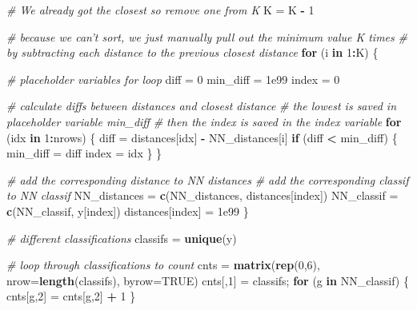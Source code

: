\documentclass[]{article}
\newenvironment{Shaded}{\begin{snugshade}}{\end{snugshade}}
\newcommand{\CommentTok}[1]{\textcolor[rgb]{0.56,0.35,0.01}{\textit{#1}}}
\newcommand{\ControlFlowTok}[1]{\textcolor[rgb]{0.13,0.29,0.53}{\textbf{#1}}}
\newcommand{\DataTypeTok}[1]{\textcolor[rgb]{0.13,0.29,0.53}{#1}}
\newcommand{\DecValTok}[1]{\textcolor[rgb]{0.00,0.00,0.81}{#1}}
\newcommand{\FloatTok}[1]{\textcolor[rgb]{0.00,0.00,0.81}{#1}}
\newcommand{\KeywordTok}[1]{\textcolor[rgb]{0.13,0.29,0.53}{\textbf{#1}}}
\newcommand{\NormalTok}[1]{#1}
\newcommand{\OperatorTok}[1]{\textcolor[rgb]{0.81,0.36,0.00}{\textbf{#1}}}
\newcommand{\OtherTok}[1]{\textcolor[rgb]{0.56,0.35,0.01}{#1}}
\newcommand{\StringTok}[1]{\textcolor[rgb]{0.31,0.60,0.02}{#1}}
\begin{document}
\begin{Shaded}
\begin{Highlighting}[]
  \CommentTok{# We already got the closest so remove one from K}
\NormalTok{  K =}\StringTok{ }\NormalTok{K }\OperatorTok{-}\StringTok{ }\DecValTok{1}
  
  \CommentTok{# because we can't sort, we just manually pull out the minimum value K times}
  \CommentTok{# by subtracting each distance to the previous closest distance}
  \ControlFlowTok{for}\NormalTok{ (i }\ControlFlowTok{in} \DecValTok{1}\OperatorTok{:}\NormalTok{K) \{}

    \CommentTok{# placeholder variables for loop}
\NormalTok{    diff =}\StringTok{ }\DecValTok{0}
\NormalTok{    min_diff =}\StringTok{ }\FloatTok{1e99}
\NormalTok{    index =}\StringTok{ }\DecValTok{0}

    \CommentTok{# calculate diffs between distances and closest distance}
    \CommentTok{# the lowest is saved in placeholder variable min_diff}
    \CommentTok{# then the index is saved in the index variable}
    \ControlFlowTok{for}\NormalTok{ (idx }\ControlFlowTok{in} \DecValTok{1}\OperatorTok{:}\NormalTok{nrows) \{}
\NormalTok{      diff =}\StringTok{ }\NormalTok{distances[idx] }\OperatorTok{-}\StringTok{ }\NormalTok{NN_distances[i]}
      \ControlFlowTok{if}\NormalTok{ (diff }\OperatorTok{<}\StringTok{ }\NormalTok{min_diff) \{}
\NormalTok{        min_diff =}\StringTok{ }\NormalTok{diff}
\NormalTok{        index =}\StringTok{ }\NormalTok{idx}
\NormalTok{      \}}
\NormalTok{    \}}

    \CommentTok{# add the corresponding distance to NN distances}
    \CommentTok{# add the corresponding classif to NN classif}
\NormalTok{    NN_distances =}\StringTok{ }\KeywordTok{c}\NormalTok{(NN_distances, distances[index])}
\NormalTok{    NN_classif =}\StringTok{ }\KeywordTok{c}\NormalTok{(NN_classif, y[index])}
\NormalTok{    distances[index] =}\StringTok{ }\FloatTok{1e99}
\NormalTok{  \}}

  \CommentTok{# different classifications}
\NormalTok{  classifs =}\StringTok{ }\KeywordTok{unique}\NormalTok{(y)}

  \CommentTok{# loop through classifications to count}
\NormalTok{  cnts =}\StringTok{ }\KeywordTok{matrix}\NormalTok{(}\KeywordTok{rep}\NormalTok{(}\DecValTok{0}\NormalTok{,}\DecValTok{6}\NormalTok{), }\DataTypeTok{nrow=}\KeywordTok{length}\NormalTok{(classifs), }\DataTypeTok{byrow=}\OtherTok{TRUE}\NormalTok{)}
\NormalTok{  cnts[,}\DecValTok{1}\NormalTok{] =}\StringTok{ }\NormalTok{classifs;}
  \ControlFlowTok{for}\NormalTok{ (g }\ControlFlowTok{in}\NormalTok{ NN_classif) \{}
\NormalTok{    cnts[g,}\DecValTok{2}\NormalTok{] =}\StringTok{ }\NormalTok{cnts[g,}\DecValTok{2}\NormalTok{] }\OperatorTok{+}\StringTok{ }\DecValTok{1}
\NormalTok{  \}}


\end{Highlighting}
\end{Shaded}
\end{document}
